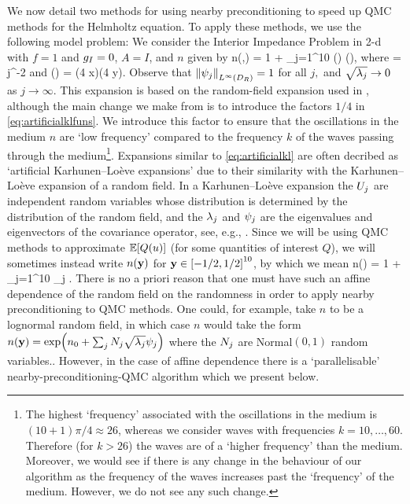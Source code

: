 We now detail two methods for using nearby preconditioning to speed up QMC methods for the Helmholtz equation. To apply these methods, we use the following model problem: We consider the Interior Impedance Problem in 2-d with $f=1$ and $g_{I}=0$, $A = I$, and $n$ given by
\beq\label{eq:artificialkl}
n(\omega,\bx) = 1 + \sum_{j=1}^{10} \Uj(\omega) \sqrt{\lambdaj} \psij(\bx),
\eeq
where
\beq\label{eq:artificialkllambdas}
\sqrt{\lambdaj} = j^{-2}
\eeq
and
\beq\label{eq:artificialklfuns}
\psij(\bx) = \cos\mleft(4 x\mright)\cos\mleft(4 y\mright).
\eeq
Observe that $\NLiDR{\psij}=1$ for all $j,$ and $\sqrt{\lambda_{j}} \rightarrow 0$ as $j \rightarrow \infty.$ This expansion is based on the random-field expansion used in \cite[Section 5.1]{GiGrKuScSl:19}, although the main change we make from \cite{GiGrKuScSl:19} is to introduce the factors $1/4$ in \cref{eq:artificialklfuns}. We introduce this factor to ensure that the oscillations in the medium $n$ are `low frequency' compared to the frequency $k$ of the waves passing through the medium\footnote{The highest `frequency' associated with the oscillations in the medium is $(10+1)\pi/4 \approx 26$, whereas we consider waves with frequencies $k=10,\ldots,60$. Therefore (for $k > 26$) the waves are of a `higher frequency' than the medium. Moreover, we would see if there is any change in the behaviour of our algorithm as the frequency of the waves increases past the `frequency' of the medium. However, we do not see any such change.}. Expansions similar to \cref{eq:artificialkl} are often decribed as `artificial Karhunen--Lo\`eve expansions' due to their similarity with the Karhunen--Lo\`eve expansion of a random field. In a Karhunen--Lo\`eve expansion the $U_{j}$ are independent random variables whose distribution is determined by the distribution of the random field, and the $\lambda_{j}$ and $\psi_{j}$ are the eigenvalues and eigenvectors of the covariance operator, see, e.g., \cite[Section 7.4]{LoPoSh:14}. Since we will be using QMC methods to approximate $\EXP{Q(u)}$ (for some quantities of interest $Q$), we will sometimes instead write $n(\mathbf{y})$ for $\by \in \cube{10}$, by which we mean
\beqs
n(\by) = 1 + \sum_{j=1}^{10} \by_{j} \sqrt{\lambdaj} \psij.
\eeqs
There is no a priori reason that one must have such an affine dependence of the random field on the randomness in order to apply nearby preconditioning to QMC methods. One could, for example, take $n$ to be a lognormal random field, in which case $n$ would take the form $n(\by) = \exp\mleft(\nz + \sum_j \Nj \sqrt{\lambdaj} \psij\mright)$ where the $N_{j}$ are Normal$(0,1)$ random variables.. However, in the case of affine dependence there is a `parallelisable' nearby-preconditioning-QMC algorithm which we present below.

